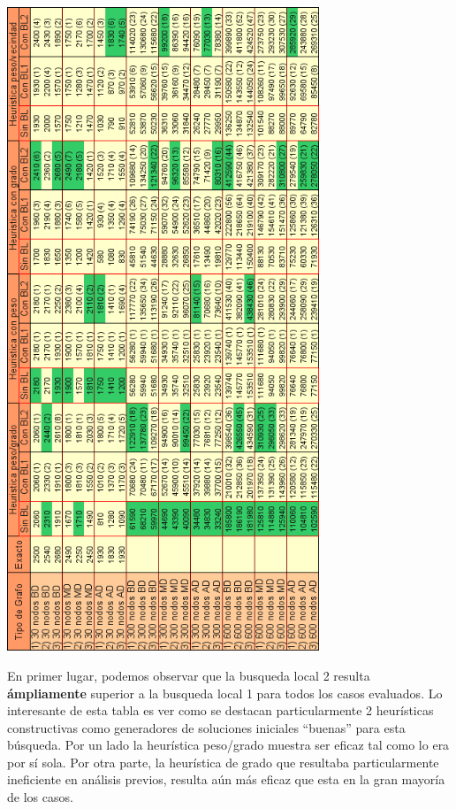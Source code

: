 \documentclass[a4paper,11pt] {article}
\begin{document}
\begin{center}
 \includegraphics[width=0.70\textwidth]{tablas/tablaHCBL.png}
\end{center}

En primer lugar, podemos observar que la busqueda local 2 resulta \textbf{ámpliamente} superior a la busqueda local 1 para todos los casos evaluados. Lo interesante de esta tabla es ver como se destacan particularmente 2 heurísticas constructivas como generadores de soluciones iniciales ``buenas'' para esta búsqueda. Por un lado la heurística peso/grado muestra ser eficaz tal como lo era por sí sola. Por otra parte, la heurística de grado que resultaba particularmente ineficiente en análisis previos, resulta aún más eficaz que esta en la gran mayoría de los casos.
\end{document}
